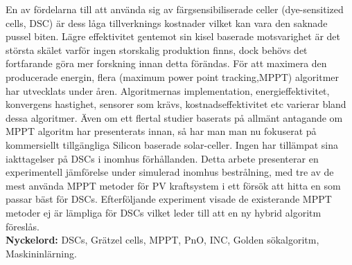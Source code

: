 En av fördelarna till att använda sig av färgsensibiliserade celler (dye-sensitized
cells, DSC) är dess låga tillverknings kostnader vilket kan vara den saknade pussel biten.
Lägre effektivitet gentemot sin kisel baserade motsvarighet är det största skälet varför ingen storskalig produktion finns, dock behövs det fortfarande göra mer forskning innan detta förändas. För att maximera den producerade energin, flera (maximum power point tracking,MPPT) algoritmer har utvecklats under åren. Algoritmernas implementation, energieffektivitet, konvergens hastighet, sensorer som krävs, kostnadseffektivitet etc varierar bland dessa algoritmer. Även om ett flertal studier baserats på allmänt
antagande om MPPT algoritm har presenterats innan, så har man man nu fokuserat
på kommersiellt tillgängliga Silicon baserade solar-celler. Ingen har tillämpat sina
iakttagelser på DSCs i inomhus förhållanden. Detta arbete presenterar en experimentell
jämförelse under simulerad inomhus bestrålning, med tre av de mest använda MPPT metoder
för PV kraftsystem i ett försök att hitta en som passar bäst för DSCs. Efterföljande
experiment visade de existerande MPPT metoder ej är lämpliga för DSCs vilket
leder till att en ny hybrid algoritm föreslås.\\
{\bf Nyckelord:} DSCs, Grätzel cells, MPPT, PnO, INC, Golden sökalgoritm, Maskininlärning. 
\acresetall
